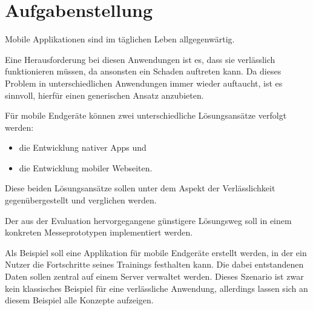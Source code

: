 \chapter*{Aufgabenstellung}
\label{cha:augabenstellung}

Mobile Applikationen sind im täglichen Leben allgegenwärtig.
 
Eine Herausforderung bei diesen Anwendungen ist es, dass sie verlässlich funktionieren müssen, da ansonsten ein Schaden auftreten kann. Da dieses Problem in unterschiedlichen Anwendungen  immer wieder auftaucht, ist es sinnvoll, hierfür einen generischen Ansatz anzubieten. 

Für mobile Endgeräte können zwei unterschiedliche Lösungsansätze verfolgt werden: 
\begin{itemize}
\item die Entwicklung nativer Apps und
\item die Entwicklung mobiler Webseiten.
\end{itemize}
Diese beiden Lösungsansätze sollen unter dem Aspekt der Verlässlichkeit gegenübergestellt und verglichen werden.

Der aus der Evaluation hervorgegangene günstigere Lösungsweg soll in einem konkreten Messeprototypen implementiert werden.

Als Beispiel soll eine Applikation für mobile Endgeräte erstellt werden, in der ein Nutzer die Fortschritte seines Trainings festhalten kann. 
Die dabei entstandenen Daten sollen zentral auf einem Server verwaltet werden. 
Dieses Szenario ist zwar kein klassisches Beispiel für eine verlässliche Anwendung, allerdings lassen sich an diesem Beispiel alle Konzepte aufzeigen.
